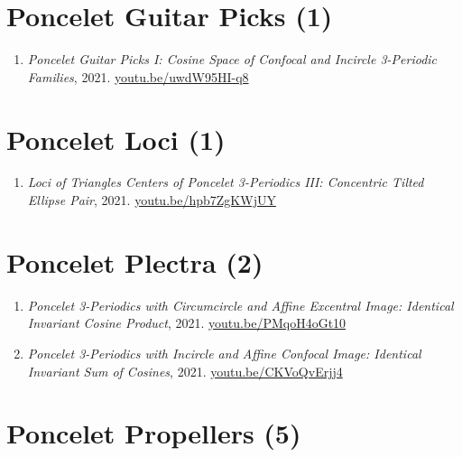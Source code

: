 \documentclass[12pt]{article}
\begin{document}
\section{Poncelet Guitar Picks (1)}

\begin{enumerate}[resume]
\item \textit{Poncelet Guitar Picks I: Cosine Space of Confocal and Incircle 3-Periodic Families}, 2021. \href{https://youtu.be/uwdW95HI-q8}{\url{youtu.be/uwdW95HI-q8}}
\end{enumerate}

\section{Poncelet Loci (1)}

\begin{enumerate}[resume]
\item \textit{Loci of Triangles Centers of Poncelet 3-Periodics III: Concentric Tilted Ellipse Pair}, 2021. \href{https://youtu.be/hpb7ZgKWjUY}{\url{youtu.be/hpb7ZgKWjUY}}
\end{enumerate}

\section{Poncelet Plectra (2)}

\begin{enumerate}[resume]
\item \textit{Poncelet 3-Periodics with Circumcircle and Affine Excentral Image: Identical Invariant Cosine Product}, 2021. \href{https://youtu.be/PMqoH4oGt10}{\url{youtu.be/PMqoH4oGt10}}
\item \textit{Poncelet 3-Periodics with Incircle and Affine Confocal Image: Identical Invariant Sum of Cosines}, 2021. \href{https://youtu.be/CKVoQvErjj4}{\url{youtu.be/CKVoQvErjj4}}
\end{enumerate}

\section{Poncelet Propellers (5)}
\end{document}
